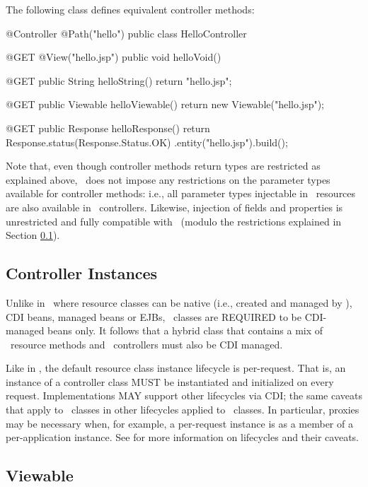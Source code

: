 The following class defines equivalent controller methods:

\begin{listing}{1}
@Controller
@Path("hello")
public class HelloController {

    @GET
    @View("hello.jsp")
    public void helloVoid() {
    }
    
    @GET
    public String helloString() {
        return "hello.jsp";
    }
    
    @GET
    public Viewable helloViewable() {
        return new Viewable("hello.jsp");
    }
    
    @GET
    public Response helloResponse() {
        return Response.status(Response.Status.OK)
                       .entity("hello.jsp").build();
    }    
}
\end{listing}

Note that, even though controller methods return types are restricted as 
explained above, \mvc\ does not impose any restrictions on the parameter
types available for controller methods: i.e., all parameter types injectable
in \jaxrs\ resources are also available in \mvc\ controllers. Likewise, injection
of fields and properties is unrestricted and fully compatible with \jaxrs\ (modulo
the restrictions explained in Section \ref{controller_instances}).

\subsection{Controller Instances}
\label{controller_instances}

Unlike in \jaxrs\ where resource classes can be native (i.e., created and managed by \jaxrs), CDI beans, 
managed beans or EJBs, \mvc\ classes are REQUIRED to be CDI-managed beans only. It follows that a hybrid 
class that contains a mix of \jaxrs\ resource methods and \mvc\ controllers must also be CDI 
managed. 

Like in \jaxrs, the default resource class instance lifecycle is per-request. 
That is, an instance of a controller class MUST be instantiated and initialized on every request. 
Implementations MAY support other lifecycles via CDI; the same caveats that apply to \jaxrs\ classes 
in other lifecycles applied to \mvc\ classes. In particular, proxies may be necessary when, for example,
a per-request instance is as a member of a per-application instance. See \cite{jaxrs} for more 
information on lifecycles and their caveats.

\subsection{Viewable}
\label{viewable}

